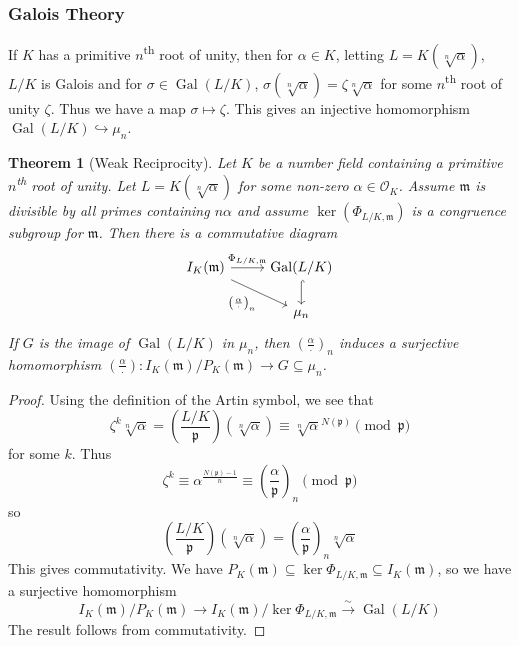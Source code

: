 \documentclass[11pt]{article}
\theoremstyle{definition}
\theoremstyle{plain}
\newtheorem{theorem}[definition]{Theorem}
\theoremstyle{remark}
\DeclareMathOperator{\Gal}{Gal}
\newcommand{\cO}{\mathcal{O}}
\newcommand{\fp}{\mathfrak{p}}
\newcommand{\fm}{\mathfrak{m}}
\newcommand{\leg}[2]{\left(\frac{#1}{#2}\right)}
\begin{document}
\subsubsection*{Galois Theory}
If $K$ has a primitive $n$\textsuperscript{th} root of unity, then for $\alpha \in K$, letting $L = K(\sqrt[n]{\alpha})$, $L/K$ is Galois and for $\sigma \in \Gal(L/K)$, $\sigma(\sqrt[n]{\alpha}) = \zeta \sqrt[n]{\alpha}$ for some $n$\textsuperscript{th} root of unity $\zeta$. Thus we have a map $\sigma \mapsto \zeta$. This gives an injective homomorphism $\Gal(L/K) \hookrightarrow \mu_n$.

\begin{theorem}[Weak Reciprocity]\label{thm:4_11}
    Let $K$ be a number field containing a primitive $n$\textsuperscript{th} root of unity. Let $L = K(\sqrt[n]{\alpha})$ for some non-zero $\alpha \in \cO_K$. Assume $\fm$ is divisible by all primes containing $n\alpha$ and assume $\ker(\Phi_{L/K, \fm})$ is a congruence subgroup for $\fm$. Then there is a commutative diagram
    \begin{equation*}
    \begin{tikzcd}
        I_K(\fm) \arrow[r, "\Phi_{L/K, \fm}"] \arrow[rd, "\leg{\alpha}{\cdot}_n"'] & \Gal(L/K) \arrow[d, hookrightarrow]\\
                           & \mu_n
    \end{tikzcd}
    \end{equation*}
    If $G$ is the image of $\Gal(L/K)$ in $\mu_n$, then $\leg{\alpha}{\cdot}_n$ induces a surjective homomorphism $\leg{\alpha}{\cdot} : I_K(\fm)/P_K(\fm) \to G \subseteq \mu_n$.
\end{theorem}
\begin{proof}
    Using the definition of the Artin symbol, we see that
    \begin{equation*}
        \zeta^k \sqrt[n]{\alpha} = \leg{L/K}{\fp}(\sqrt[n]{\alpha}) \equiv \sqrt[n]{\alpha}^{N(\fp)} \pmod{\fp}
    \end{equation*}
    for some $k$. Thus
    \begin{equation*}
        \zeta^k \equiv \alpha^\frac{N(\fp)-1}{n} \equiv \leg{\alpha}{\fp}_n \pmod{\fp}
    \end{equation*}
    so
    \begin{equation*}
        \leg{L/K}{\fp}(\sqrt[n]{\alpha}) = \leg{\alpha}{\fp}_n \sqrt[n]{\alpha}
    \end{equation*}
    This gives commutativity. We have $P_K(\fm) \subseteq \ker \Phi_{L/K, \fm} \subseteq I_K(\fm)$, so we have a surjective homomorphism
    \begin{equation*}
        I_K(\fm) / P_K(\fm) \to I_K(\fm) / \ker \Phi_{L/K, \fm} \xrightarrow{\sim} \Gal(L/K)
    \end{equation*}
    The result follows from commutativity.
\end{proof}
\end{document}
